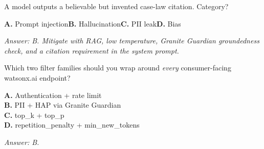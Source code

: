 \begin{practicebox}[title=\textbf{Q2.6 --- Risks}]
A model outputs a believable but invented case-law citation. Category?

\textbf{A.} Prompt injection\hspace{1em}\textbf{B.} Hallucination\hspace{1em}\textbf{C.} PII leak\hspace{1em}\textbf{D.} Bias

\vspace{0.2cm}\textit{Answer: B. Mitigate with RAG, low temperature, Granite Guardian groundedness check, and a citation requirement in the system prompt.}
\end{practicebox}

\begin{practicebox}[title=\textbf{Q2.7 --- HAP / PII}]
Which two filter families should you wrap around \emph{every} consumer-facing watsonx.ai endpoint?

\textbf{A.} Authentication + rate limit\\
\textbf{B.} PII + HAP via Granite Guardian\\
\textbf{C.} top\_k + top\_p\\
\textbf{D.} repetition\_penalty + min\_new\_tokens

\vspace{0.2cm}\textit{Answer: B.}
\end{practicebox}

\cleardoublepage
